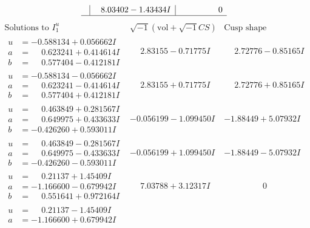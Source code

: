 \documentclass[1p]{elsarticle_modified}
\theoremstyle{definition}
\newcommand{\I}{\sqrt{-1}}
\begin{document}
$$\begin{array}{c|c|c}
 & \phantom{-}8.03402 - 1.43434 I & \phantom{-0.000000 } 0\\
 \hline 
 \end{array}$$\newpage$$\begin{array}{c|c|c}  
\text{Solutions to }I^u_{1}& \I (\text{vol} + \sqrt{-1}CS) & \text{Cusp shape}\\
 \hline 
\begin{aligned}
u &= -0.588134 + 0.056662 I \\
a &= \phantom{-}0.623241 + 0.414614 I \\
b &= \phantom{-}0.577404 - 0.412181 I\end{aligned}
 & \phantom{-}2.83155 - 0.71775 I & \phantom{-}2.72776 - 0.85165 I \\ \hline\begin{aligned}
u &= -0.588134 - 0.056662 I \\
a &= \phantom{-}0.623241 - 0.414614 I \\
b &= \phantom{-}0.577404 + 0.412181 I\end{aligned}
 & \phantom{-}2.83155 + 0.71775 I & \phantom{-}2.72776 + 0.85165 I \\ \hline\begin{aligned}
u &= \phantom{-}0.463849 + 0.281567 I \\
a &= \phantom{-}0.649975 + 0.433633 I \\
b &= -0.426260 + 0.593011 I\end{aligned}
 & -0.056199 - 1.099450 I & -1.88449 + 5.07932 I \\ \hline\begin{aligned}
u &= \phantom{-}0.463849 - 0.281567 I \\
a &= \phantom{-}0.649975 - 0.433633 I \\
b &= -0.426260 - 0.593011 I\end{aligned}
 & -0.056199 + 1.099450 I & -1.88449 - 5.07932 I \\ \hline\begin{aligned}
u &= \phantom{-}0.21137 + 1.45409 I \\
a &= -1.166600 - 0.679942 I \\
b &= \phantom{-}0.551641 + 0.972164 I\end{aligned}
 & \phantom{-}7.03788 + 3.12317 I & \phantom{-0.000000 } 0 \\ \hline\begin{aligned}
u &= \phantom{-}0.21137 - 1.45409 I \\
a &= -1.166600 + 0.679942 I \\

\end{aligned}
\end{array}$$
\end{document}
